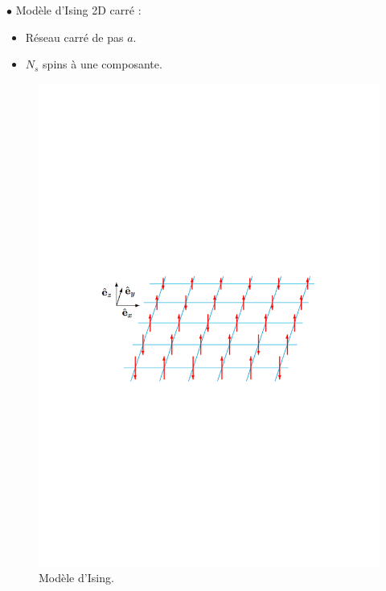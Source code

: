\documentclass[9pt]{beamer}
\begin{document}
\setlength{\columnseprule}{0.4pt}
\begin{frame}
		\justifying
		\vspace*{22pt}


\begin{multicols}{2}

		$\bullet$ Modèle d'Ising 2D carré :
		\begin{itemize}
			\item Réseau carré de pas $a$.
			\item $N_s$ spins à une composante.
		\end{itemize}
	
		
\begin{figure}[H]
\begin{center}
\includegraphics[scale =0.35]{Ising2D.pdf}
\caption{Modèle d'Ising.}
	\label{fig:schemaIsing}
	\end{center}
\end{figure}


\end{multicols}
\end{frame}
\end{document}
